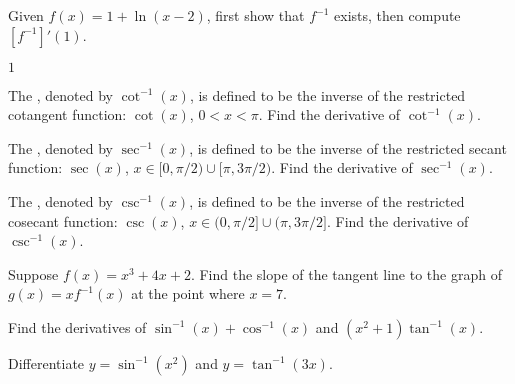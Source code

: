 \begin{enumialphparenastyle}

\begin{ex} 
	Given $f(x)=1+\ln(x-2)$, first show that $f^{-1}$ exists, then compute $\left[f^{-1}\right]'(1)$.
\begin{sol}
	$1$
\end{sol}
\end{ex}

\begin{ex}
The , denoted by $\cot^{-1}(x)$, is defined to be the inverse of the restricted cotangent function: $\cot (x)$, $0<x<\pi$. Find the derivative of $\cot^{-1}(x)$.
\end{ex}

\begin{ex}
The , denoted by $\sec^{-1}(x)$, is defined to be the inverse of the restricted secant function: $\sec(x)$, $x\in[0,\pi/2)\cup[\pi,3\pi/2)$. Find the derivative of $\sec^{-1}(x)$.
\end{ex}

\begin{ex}
The , denoted by $\csc^{-1}(x)$, is defined to be the inverse of the restricted cosecant function: $\csc(x)$, $x\in(0,\pi/2]\cup(\pi,3\pi/2]$. Find the derivative of $\csc^{-1}(x)$.
\end{ex}

\begin{ex}
Suppose $f(x)=x^3+4x+2$. Find the slope of the tangent line to the graph of $g(x)=xf^{-1}(x)$ at the point where $x=7$.
\end{ex}

\begin{ex}
Find the derivatives of $\sin^{-1}(x)+\cos^{-1}(x)$ and $(x^2+1)\tan^{-1}(x)$.
\end{ex}

\begin{ex}
Differentiate $y=\sin^{-1}(x^2)$ and $y=\tan^{-1}(3x)$.
\end{ex}

\end{enumialphparenastyle}